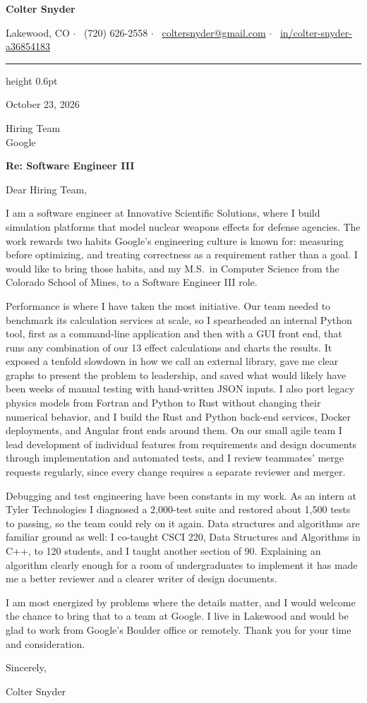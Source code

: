 \documentclass[letterpaper,11pt]{article}
\begin{document}
\begin{center}
  {\Huge\bfseries Colter Snyder}\par\vspace{4pt}
  \footnotesize
  Lakewood, CO \enspace$\cdot$\enspace
  \faPhone*\ (720) 626-2558 \enspace$\cdot$\enspace
  \faEnvelope\ \href{mailto:coltersnyder@gmail.com}{coltersnyder@gmail.com} \enspace$\cdot$\enspace
  \mbox{\faLinkedin\ \href{https://www.linkedin.com/in/colter-snyder-a36854183/}{in/colter-snyder-a36854183}}
\end{center}
{\color{accent}\hrule height 0.6pt}
\vspace{6pt}

October 23, 2026

Hiring Team\\
Google

\textbf{Re: Software Engineer III}

Dear Hiring Team,

I am a software engineer at Innovative Scientific Solutions, where I build simulation platforms that
model nuclear weapons effects for defense agencies. The work rewards two habits Google's engineering
culture is known for: measuring before optimizing, and treating correctness as a requirement rather
than a goal. I would like to bring those habits, and my M.S.\ in Computer Science from the Colorado
School of Mines, to a Software Engineer III role.

Performance is where I have taken the most initiative. Our team needed to benchmark its calculation
services at scale, so I spearheaded an internal Python tool, first as a command-line application and
then with a GUI front end, that runs any combination of our 13 effect calculations and charts the
results. It exposed a tenfold slowdown in how we call an external library, gave me clear graphs to
present the problem to leadership, and saved what would likely have been weeks of manual testing with
hand-written JSON inputs. I also port
legacy physics models from Fortran and Python to Rust without changing their numerical behavior, and
I build the Rust and Python back-end services, Docker deployments, and Angular front ends around them.
On our small agile team I lead development of individual features from requirements and design
documents through implementation and automated tests, and I review teammates' merge requests
regularly, since every change requires a separate reviewer and merger.

Debugging and test engineering have been constants in my work. As an intern at Tyler Technologies I
diagnosed a 2,000-test suite and restored about 1,500 tests to passing, so the team could rely on it
again. Data structures and algorithms are familiar ground as well: I co-taught CSCI 220, Data
Structures and Algorithms in C++, to 120 students, and I taught another section of 90. Explaining an
algorithm clearly enough for a room of undergraduates to implement it has made me a better reviewer
and a clearer writer of design documents.

I am most energized by problems where the details matter, and I would welcome the chance to bring that
to a team at Google. I live in Lakewood and would be glad to work from Google's Boulder office or remotely. Thank you for your time and consideration.

Sincerely,

Colter Snyder
\end{document}
